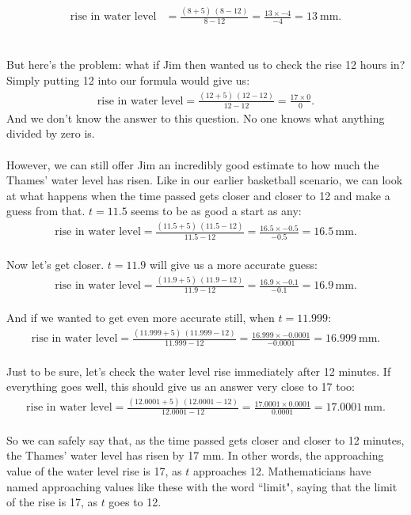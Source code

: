 \documentclass[11pt]{article}
\numberwithin{equation}{section}
\begin{document}
\begin{align*}
\textrm{rise in water level} &= \frac{(8 + 5) \ (8 - 12)}{8 - 12} = \frac{13 \times -4}{-4} = 13 \ \textrm{mm.}
\end{align*}
\\ \\ 
But here's the problem: what if Jim then wanted us to check the rise 12 hours in? Simply putting 12 into our formula would give us:
\begin{align*}
\textrm{rise in water level} = \frac{(12 + 5) \ (12 - 12)}{12 - 12} = \frac{17 \times 0}{0}.
\end{align*}
And we don't know the answer to this question. No one knows what anything divided by zero is. 
\\ \\
However, we can still offer Jim an incredibly good estimate to how much the Thames' water level has risen. Like in our earlier basketball scenario, we can look at what happens when the time passed gets closer and closer to 12 and make a guess from that. \(t = 11.5\) seems to be as good a start as any:
\begin{align*}
\textrm{rise in water level} = \frac{(11.5 + 5) \ (11.5 - 12)}{11.5 - 12} = \frac{16.5 \times -0.5}{-0.5} = 16.5 \, \textrm{mm.}
\end{align*}
\\ Now let's get closer. \(t = 11.9\) will give us a more accurate guess:
\begin{align*}
\textrm{rise in water level} = \frac{(11.9 + 5) \ (11.9 - 12)}{11.9 - 12} = \frac{16.9 \times -0.1}{-0.1} = 16.9 \, \textrm{mm.}
\end{align*}
\\ And if we wanted to get even more accurate still, when \(t = 11.999\):
\begin{align*}
\textrm{rise in water level} = \frac{(11.999 + 5) \ (11.999 - 12)}{11.999 - 12} = \frac{16.999 \times -0.0001}{-0.0001} = 16.999 \ \textrm{mm.}
\end{align*}
\\ Just to be sure, let's check the water level rise immediately after 12 minutes. If everything goes well, this should give us an answer very close to 17 too:
\begin{align*}
\textrm{rise in water level} = \frac{(12.0001 + 5) \ (12.0001 - 12)}{12.0001 - 12} = \frac{17.0001 \times 0.0001}{0.0001} = 17.0001 \, \textrm{mm.}
\end{align*}
\\ So we can safely say that, as the time passed gets closer and closer to 12 minutes, the Thames' water level has risen by 17 mm. In other words, the approaching value of the water level rise is 17, as \(t\) approaches 12. Mathematicians have named approaching values like these with the word ``limit", saying that the limit of the rise is 17, as \(t\) goes to 12.
\end{document}
